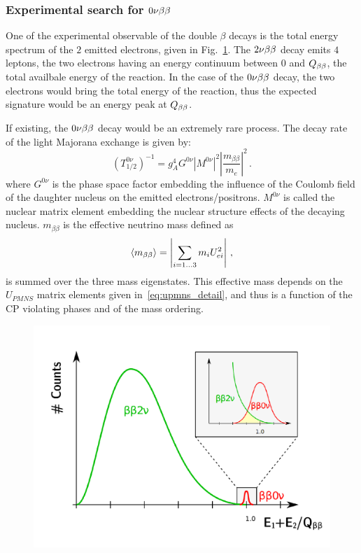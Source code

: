 \subsubsection*{Experimental search for $0\nu\beta\beta$}

One of the experimental observable of the double $\beta$ decays is the total energy spectrum of the $2$ emitted electrons, given in Fig.~\ref{fig:bb_energy}.
The $2\nu\beta\beta$ decay emits $4$ leptons, the two electrons having an energy continuum between $0$ and $Q_{\beta\beta}$, the total availbale energy of the reaction.
In the case of the $0\nu\beta\beta$ decay, the two electrons would bring the total energy of the reaction, thus the expected signature would be an energy peak at $Q_{\beta\beta}$.

If existing, the $0\nu\beta\beta$ decay would be an extremely rare process.
The decay rate of the light Majorana exchange is given by:
\begin{equation}
  (T_{1/2}^{0\nu})^{-1} = g_{A}^{4}G^{0\nu}|M^{0\nu}|^{2}\left\lvert\dfrac{m_{\beta\beta}}{m_{e}}\right\rvert^{2}\,.
\end{equation}
where $G^{0\nu}$ is the phase space factor embedding the influence of the Coulomb field of the daughter nucleus on the emitted electrons/positrons.
$M^{0\nu}$ is called the nuclear matrix element embedding the nuclear structure effects of the decaying nucleus.
$m_{\beta\beta}$ is the effective neutrino mass defined as
\begin{equation}
  \langle m_{\beta\beta} \rangle = \left\vert \sum_{i=1...3}m_{i}U^{2}_{ei} \right\vert \,,
\end{equation}
is summed over the three mass eigenstates.
This effective mass depends on the $U_{PMNS}$ matrix elements given in~\ref{eq:upmns_detail}, and thus is a function of the CP violating phases and of the mass ordering.

\begin{figure}[h!]
  \centering
    \includegraphics[height=0.6\textwidth]{neutrinophysics/fig_neutrinophysics/reconstructed_energy.pdf}
  \caption{
    \label{fig:bb_energy}}
\end{figure}



